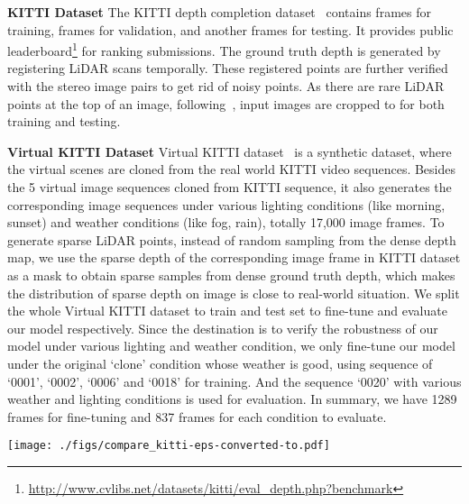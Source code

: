 \documentclass[journal]{IEEEtran}
\begin{document}
{\bf KITTI Dataset} The KITTI depth completion dataset~\cite{sparsity_cnn} contains  frames for training,  frames for validation, and another  frames for testing.
It provides public leaderboard\footnote{\url{http://www.cvlibs.net/datasets/kitti/eval_depth.php?benchmark}} for ranking submissions. 
The ground truth depth is generated by registering LiDAR scans temporally.
These registered points are further verified with the stereo image pairs to get rid of noisy points.
As there are rare LiDAR points at the top of an image, following~\cite{sparse_noisy}, input images are cropped to  for both training and testing.

{\bf Virtual KITTI Dataset} Virtual KITTI dataset~\cite{vkitti} is a synthetic dataset, where the virtual scenes are cloned from the real world
KITTI video sequences. 
Besides the 5 virtual image sequences cloned from KITTI sequence,
it also generates the corresponding image sequences under various lighting conditions (like morning, sunset) and weather conditions (like fog, rain),
totally 17,000 image frames.
To generate sparse LiDAR points, instead of random sampling from the dense depth map,
we use the sparse depth of the corresponding image frame in KITTI dataset as a mask to obtain sparse samples from dense ground truth depth,
which makes the distribution of sparse depth on image is close to real-world situation.
We split the whole Virtual KITTI dataset to train and test set to fine-tune and evaluate our model respectively.
Since the destination is to verify the robustness of our model under various lighting and weather condition,
we only fine-tune our model under the original `clone' condition whose weather is good, using sequence of `0001', `0002', `0006' and `0018' for training.
And the sequence `0020' with various weather and lighting conditions is used for evaluation. 
In summary, we have 1289 frames for fine-tuning and 837 frames for each condition to evaluate.


\begin{figure*}
   \begin{center}
   \texttt{[image: ./figs/compare\_kitti-eps-converted-to.pdf]}
   \end{center}
      \caption{Qualitative comparison with state-of-the-art methods on KITTI test set.
      The results are from the KITTI depth completion leaderboard in which depth images are colorized along with depth range.
      Our results are shown in the bottom row and compared with top-ranking methods
      `Sparse-to-Dense'~\cite{sparse_to_dense}, `DDP'~\cite{ddp}, `DeepLiDAR'~\cite{deep_lidar}, `CSPN'~\cite{depth_affinity,cspn_journal} and `NConv-CNN'~\cite{cnn_confidence}.
      In the zoomed regions, our method recovers better 3D details.
      }
   \label{fig:compare_kitti}
\end{figure*}
\end{document}
